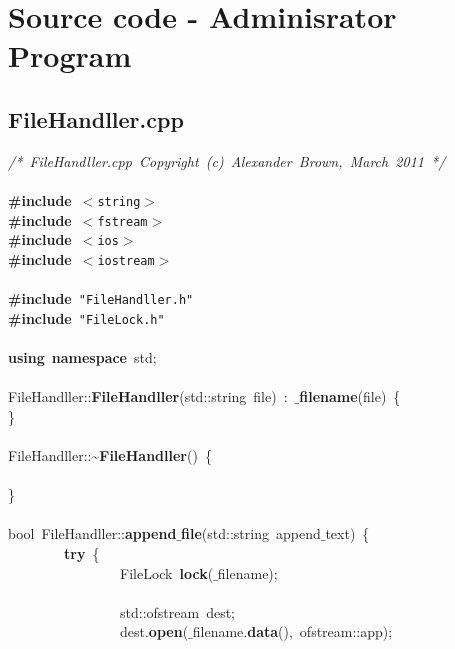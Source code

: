 \section{Source code - Adminisrator Program}
\normalsize
\rmfamily
\subsection{FileHandller.cpp}
\scriptsize
\sffamily
\noindent
\mbox{}\textit{/*\ FileHandller.cpp\ Copyright\ (c)\ Alexander\ Brown,\ March\ 2011\ */} \\
\mbox{} \\
\mbox{}\textbf{\#include}\ \texttt{$<$string$>$} \\
\mbox{}\textbf{\#include}\ \texttt{$<$fstream$>$} \\
\mbox{}\textbf{\#include}\ \texttt{$<$ios$>$} \\
\mbox{}\textbf{\#include}\ \texttt{$<$iostream$>$} \\
\mbox{} \\
\mbox{}\textbf{\#include}\ \texttt{"{}FileHandller.h"{}} \\
\mbox{}\textbf{\#include}\ \texttt{"{}FileLock.h"{}} \\
\mbox{} \\
\mbox{}\textbf{using}\ \textbf{namespace}\ std; \\
\mbox{} \\
\mbox{}FileHandller::\textbf{FileHandller}(std::string\ file)\ :\ \textbf{$\_$filename}(file)\ \{ \\
\mbox{}\} \\
\mbox{} \\
\mbox{}FileHandller::\textasciitilde{}\textbf{FileHandller}()\ \{ \\
\mbox{} \\
\mbox{}\} \\
\mbox{} \\
\mbox{}bool\ FileHandller::\textbf{append$\_$file}(std::string\ append$\_$text)\ \{ \\
\mbox{}\ \ \ \ \ \ \ \ \textbf{try}\ \{ \\
\mbox{}\ \ \ \ \ \ \ \ \ \ \ \ \ \ \ \ FileLock\ \textbf{lock}($\_$filename); \\
\mbox{} \\
\mbox{}\ \ \ \ \ \ \ \ \ \ \ \ \ \ \ \ std::ofstream\ dest; \\
\mbox{}\ \ \ \ \ \ \ \ \ \ \ \ \ \ \ \ dest.\textbf{open}($\_$filename.\textbf{data}(),\ ofstream::app); \\
